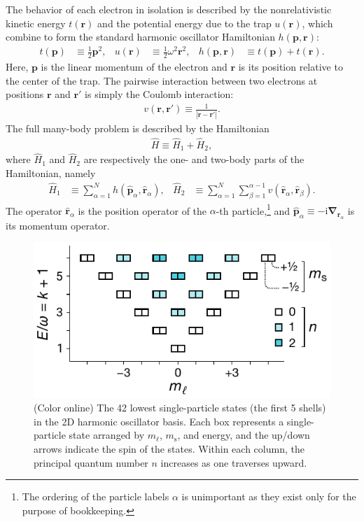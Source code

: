 The behavior of each electron in isolation is described by the nonrelativistic kinetic energy $t(\bm{r})$ and the potential energy due to the trap $u(\bm{r})$, which combine to form the standard harmonic oscillator Hamiltonian $h(\bm{p}, \bm{r})$:
\begin{align*}
  t(\bm{p}) &\equiv \frac{1}{2} \bm{p}^2, &
  u(\bm{r}) &\equiv \frac{1}{2} \omega^2 \bm{r}^2, &
  h(\bm{p}, \bm{r}) &\equiv t(\bm{p}) + t(\bm{r}).
\end{align*}
Here, $\bm{p}$ is the linear momentum of the electron and $\bm{r}$ is its position relative to the center of the trap.  The pairwise interaction between two electrons at positions $\bm{r}$ and $\bm{r}'$ is simply the Coulomb interaction:
\begin{align*}
  v(\bm{r}, \bm{r}') \equiv \frac{1}{|\bm{r} - \bm{r}'|}.
\end{align*}
The full many-body problem is described by the Hamiltonian
\begin{align*}
  \hat H \equiv \hat H_1 + \hat H_2,
\end{align*}
where $\hat{H}_1$ and $\hat{H}_2$ are respectively the one- and two-body parts of the Hamiltonian, namely
\begin{align} \label{eq:onetwobodyhamiltonian}
\hat{H}_1 &\equiv \sum_{\alpha = 1}^N h(\hat{\bm p}_\alpha, \hat{\bm r}_\alpha), &
\hat{H}_2 &\equiv \sum_{\alpha = 1}^N \sum_{\beta = 1}^{\alpha - 1} v(\hat{\bm r}_\alpha, \hat{\bm r}_\beta).
\end{align}
The operator $\hat{\bm r}_\alpha$ is the position operator of the $\alpha$-th particle,\footnote{The ordering of the particle labels $\alpha$ is unimportant as they exist only for the purpose of bookkeeping.} and $\hat{\bm p}_\alpha \equiv -\mathrm{i} \hat{\bm{\nabla}}_{\bm{r}_\alpha}$ is its momentum operator.

\begin{figure}
  \includegraphics{fig-shell-structure-v2.pdf}
  \caption{(Color online) The 42 lowest single-particle states (the first 5 shells) in the 2D harmonic oscillator basis.  Each box represents a single-particle state arranged by $m_\ell$, $m_{\mathrm{s}}$, and energy, and the up/down arrows indicate the spin of the states.  Within each column, the principal quantum number $n$ increases as one traverses upward.}
  \label{fig:shell-structure}
\end{figure}

